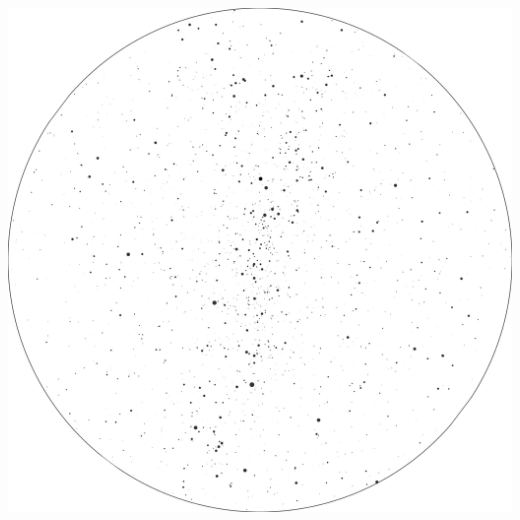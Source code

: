 \documentclass{./SAS-class-skygen}
\begin{document}
	\vspace{0.5cm}
    \begin{center}
    \includegraphics[width=\textwidth]{./pics/skychart40.png}
    \end{center}
    
    
\end{document}
